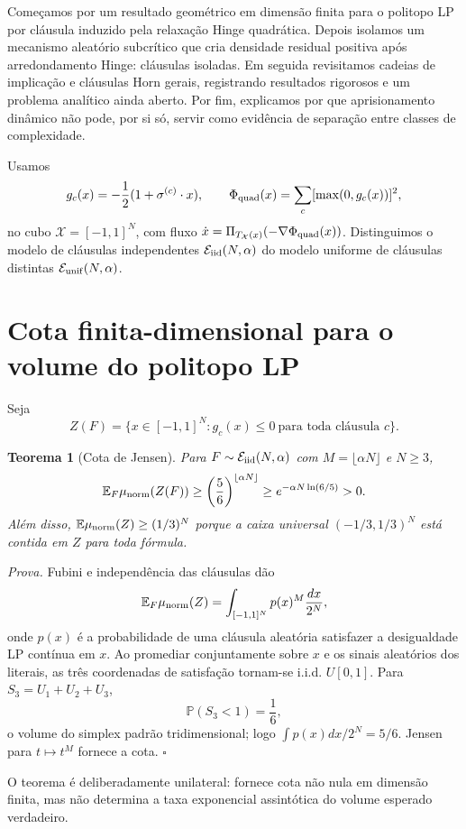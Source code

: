 \documentclass[11pt,a4paper]{article}
\newtheorem{theorem}{Teorema}[section]
\newcommand{\X}{\mathcal X}
\begin{document}
Começamos por um resultado geométrico em dimensão finita para o politopo LP por cláusula induzido pela relaxação Hinge quadrática. Depois isolamos um mecanismo aleatório subcrítico que cria densidade residual positiva após arredondamento Hinge: cláusulas isoladas. Em seguida revisitamos cadeias de implicação e cláusulas Horn gerais, registrando resultados rigorosos e um problema analítico ainda aberto. Por fim, explicamos por que aprisionamento dinâmico não pode, por si só, servir como evidência de separação entre classes de complexidade.

Usamos
\[
g_c(x)=-\frac12(1+\sigma^{(c)}\cdot x),\qquad \Phi_{\rm quad}(x)=\sum_c[\max(0,g_c(x))]^2,
\]
no cubo $\X=[-1,1]^N$, com fluxo $\dot x=\Pi_{T_\X(x)}(-\nabla\Phi_{\rm quad}(x))$. Distinguimos o modelo de cláusulas independentes $\mathcal E_{\rm iid}(N,\alpha)$ do modelo uniforme de cláusulas distintas $\mathcal E_{\rm unif}(N,\alpha)$.

\section{Cota finita-dimensional para o volume do politopo LP}
Seja
\[
Z(F)=\{x\in[-1,1]^N:g_c(x)\le0\ \text{para toda cláusula }c\}.
\]

\begin{theorem}[Cota de Jensen]
Para $F\sim\mathcal E_{\rm iid}(N,\alpha)$ com $M=\lfloor\alpha N\rfloor$ e $N\ge3$,
\[
\mathbb E_F\mu_{\rm norm}(Z(F))\ge\left(\frac56\right)^{\lfloor\alpha N\rfloor}\ge e^{-\alpha N\ln(6/5)}>0.
\]
Além disso, $\mathbb E\mu_{\rm norm}(Z)\ge(1/3)^N$ porque a caixa universal $(-1/3,1/3)^N$ está contida em $Z$ para toda fórmula.
\end{theorem}

\noindent\textit{Prova.} Fubini e independência das cláusulas dão
\[
\mathbb E_F\mu_{\rm norm}(Z)=\int_{[-1,1]^N}p(x)^M\frac{dx}{2^N},
\]
onde $p(x)$ é a probabilidade de uma cláusula aleatória satisfazer a desigualdade LP contínua em $x$. Ao promediar conjuntamente sobre $x$ e os sinais aleatórios dos literais, as três coordenadas de satisfação tornam-se i.i.d. $U[0,1]$. Para $S_3=U_1+U_2+U_3$,
\[
\mathbb P(S_3<1)=\frac16,
\]
o volume do simplex padrão tridimensional; logo $\int p(x)dx/2^N=5/6$. Jensen para $t\mapsto t^M$ fornece a cota. \hfill$\square$

O teorema é deliberadamente unilateral: fornece cota não nula em dimensão finita, mas não determina a taxa exponencial assintótica do volume esperado verdadeiro.
\end{document}
